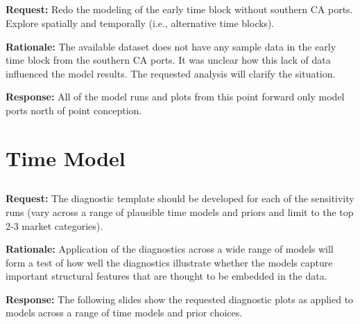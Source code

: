 \documentclass[ xcolor = pdftex, dvipsnames, table ]{beamer}
\begin{document}
%
\subsection{}
\begin{frame}
\textbf{Request:}
Redo the modeling of the early time block without southern CA ports. Explore 
spatially and temporally (i.e., alternative time blocks).

\textbf{Rationale:}
The available dataset does not have any sample data in the early time block 
from the southern CA ports. It was unclear how this lack of data influenced 
the model results. The requested analysis will clarify the situation.

\textbf{Response:}
All of the model runs and plots from this point forward only model ports 
north of point conception. 

\end{frame}

%
%

%
\section{Time Model}
\subsection{}
%

%
%

\begin{frame}
\textbf{Request:}
The diagnostic template should be developed for each of the sensitivity runs 
(vary across a range of plausible time models and priors and limit to the top 
2-3 market categories).  

\textbf{Rationale:}
Application of the diagnostics across a wide range of models will form a test 
of how well the diagnostics illustrate whether the models capture important 
structural features that are thought to be embedded in the data.

\textbf{Response:}
The following slides show the requested diagnostic plots as applied to models 
across a range of time models and prior choices.

\end{frame}

%
%
\end{document}
